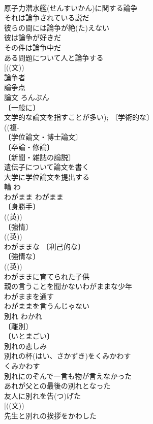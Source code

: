\documentclass[8pt]{extreport}
\begin{document}
\begin{CJK}{UTF8}{min}
\\	原子力潜水艦(せんすいかん)に関する論争 
\\	それは論争されている説だ 
\\	彼らの間には論争が絶(た)えない 
\\	彼は論争が好きだ 
\\	その件は論争中だ 
\\	ある問題について人と論争する 
\\	[((文))
\\	論争者 
\\	論争点 
\\	論文	ろんぶん	
\\	〔一般に〕
\\	文学的な論文を指すことが多い); 〔学術的な〕
\\	((複-
\\	〔学位論文・博士論文〕
\\	〔卒論・修論〕
\\	〔新聞・雑誌の論説〕
\\	遺伝子について論文を書く 
\\	大学に学位論文を提出する 
\\	輪	わ	
\\	わがまま	わがまま	
\\	〔身勝手〕
\\	((英)) 
\\	〔強情〕
\\	((英)) 
\\	わがままな 〔利己的な〕
\\	〔強情な〕
\\	((英)) 
\\	わがままに育てられた子供 
\\	親の言うことを聞かないわがままな少年 
\\	わがままを通す 
\\	わがままを言うんじゃない 
\\	別れ	わかれ	
\\	〔離別〕
\\	〔いとまごい〕
\\	別れの悲しみ 
\\	別れの杯(はい、さかずき)をくみかわす 
\\	くみかわす　
\\	別れにのぞんで一言も物が言えなかった 
\\	あれが父との最後の別れとなった 
\\	友人に別れを告(つ)げた 
\\	[((文))
\\	先生と別れの挨拶をかわした 

\end{CJK}
\end{document}
